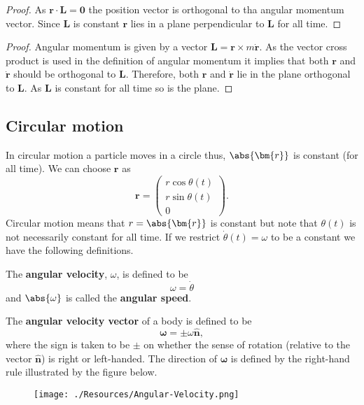 \documentclass[12pt, a4paper]{article}
\begin{document}
\begin{proof}
    As \(\bm{r} \cdot \bm{L} = \bm{0}\) the position vector is orthogonal to tha angular momentum vector. Since \(\bm{L}\) is constant \(\bm{r}\) lies in a plane perpendicular to \(\bm{L}\) for all time.
\end{proof}

\begin{proof}
    Angular momentum is given by a vector \(\bm{L}=\bm{r} \times m\bm{\dot{r}}\). As the vector cross product is used in the definition of angular momentum it implies that both \(\bm{r}\) and \(\bm{\dot{r}}\) should be orthogonal to \(\bm{L}\). Therefore, both \(\bm{r}\) and \(\bm{\dot{r}}\) lie in the plane orthogonal to \(\bm{L}\). As \(\bm{L}\) is constant for all time so is the plane.
\end{proof}

\subsection{Circular motion}

In circular motion a particle moves in a circle thus, \(\abs{\bm{r}}\) is constant (for all time). We can choose \(\bm{r}\) as
\[\bm{r}=\begin{pmatrix}
    r\cos\theta(t) \\ r\sin\theta(t) \\0
\end{pmatrix}.\]
Circular motion means that \(r=\abs{\bm{r}}\) is constant but note that \(\theta(t)\) is not necessarily constant for all time. If we restrict \(\dot{\theta}(t)=\omega\) to be a constant we have the following definitions.

\begin{definition}
    The \textbf{angular velocity}, \(\omega\), is defined to be \[\omega = \dot{\theta}\]
    and \(\abs{\omega}\) is called the \textbf{angular speed}.
\end{definition}

\begin{definition}
    The \textbf{angular velocity vector} of a body is defined to be
    \[\bm{\omega}=\pm \omega \hat{\bm{n}},\]
    where the sign is taken to be \(\pm\) on whether the sense of rotation (relative to the vector \(\hat{\bm{n}}\)) is right or left-handed. The direction of \(\bm{\omega}\) is defined by the right-hand rule illustrated by the figure below.
\end{definition}

\begin{figure}[H]
    \begin{center}
        \texttt{[image: ./Resources/Angular-Velocity.png]}
    \end{center}
\end{figure}
\end{document}

